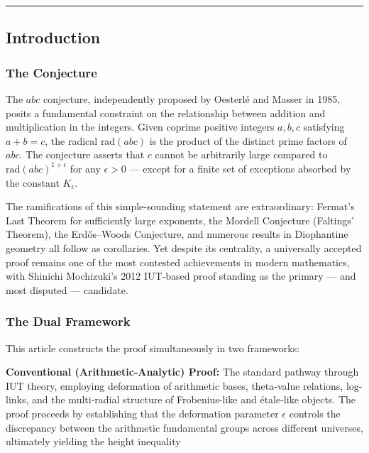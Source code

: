 \documentclass[12pt,a4paper]{article}
\begin{document}
\begin{center}
\rule{0.5\textwidth}{0.4pt}
\end{center}

\subsection{Introduction}

\subsubsection{The Conjecture}

The $abc$ conjecture, independently proposed by Oesterlé and Masser in 1985, posits a fundamental constraint on the relationship between addition and multiplication in the integers. Given coprime positive integers $a, b, c$ satisfying $a + b = c$, the radical $\text{rad}(abc)$ is the product of the distinct prime factors of $abc$. The conjecture asserts that $c$ cannot be arbitrarily large compared to $\text{rad}(abc)^{1+\epsilon}$ for any $\epsilon > 0$ --- except for a finite set of exceptions absorbed by the constant $K_{\epsilon}$.

The ramifications of this simple-sounding statement are extraordinary: Fermat's Last Theorem for sufficiently large exponents, the Mordell Conjecture (Faltings' Theorem), the Erdős--Woods Conjecture, and numerous results in Diophantine geometry all follow as corollaries. Yet despite its centrality, a universally accepted proof remains one of the most contested achievements in modern mathematics, with Shinichi Mochizuki's 2012 IUT-based proof standing as the primary --- and most disputed --- candidate.

\subsubsection{The Dual Framework}

This article constructs the proof simultaneously in two frameworks:

\textbf{Conventional (Arithmetic-Analytic) Proof:} The standard pathway through IUT theory, employing deformation of arithmetic bases, theta-value relations, log-links, and the multi-radial structure of Frobenius-like and étale-like objects. The proof proceeds by establishing that the deformation parameter $\epsilon$ controls the discrepancy between the arithmetic fundamental groups across different universes, ultimately yielding the height inequality
\end{document}
